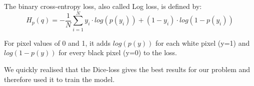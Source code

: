 The binary cross-entropy loss, also called Log loss, is defined by:
\begin{equation}\label{eq_bincross}
    H_p (q) = -\frac{1}{N} \sum ^N _{i=1} y_i \cdot log(p(y_i))+(1-y_i) \cdot log(1-p(y_i))
\end{equation}

For pixel values of 0 and 1, it adds $log(p(y))$ for each white pixel (y=1) and $log(1-p(y))$ for every black pixel (y=0) to the loss.

We quickly realised that the Dice-loss gives the best results for our problem and therefore used it to train the model. %

%

